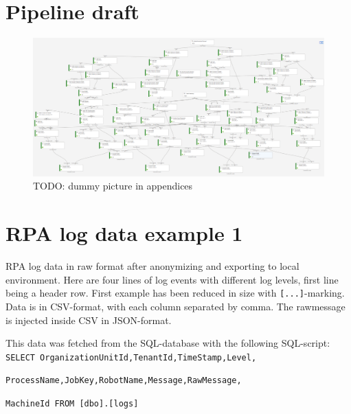 
\clearpage


\thesisappendix

\section{Pipeline draft}\label{sec:app-pipeline-draft}

\begin{figure}[htb]
    \centering
    \includegraphics[width=180mm,angle=90]{./appendices/pipeline-draft}
    \caption{TODO: dummy picture in appendices
    \label{fig:app-pipeline}}
\end{figure}

\clearpage


\section{RPA log data example 1}\label{sec:app-log-data-input}

RPA log data in raw format after anonymizing and exporting to local environment.
Here are four lines of log events with different log levels,
first line being a header row.
First example has been reduced in size with \verb-[...]--marking.
Data is in CSV-format,
with each column separated by comma.
The rawmessage is injected inside CSV
in JSON-format.

This data was fetched from the SQL-database
with the following SQL-script:
\verb=SELECT OrganizationUnitId,TenantId,TimeStamp,Level,=

\verb=ProcessName,JobKey,RobotName,Message,RawMessage,=

\verb=MachineId FROM [dbo].[logs]=

